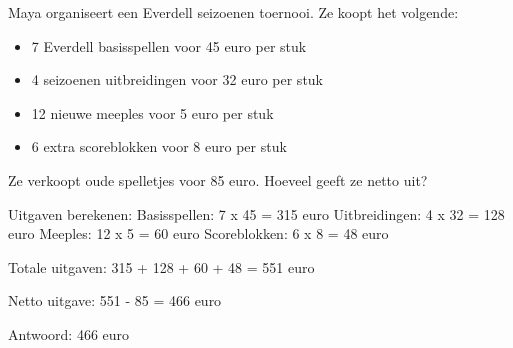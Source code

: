 \begin{opgave}
Maya organiseert een Everdell seizoenen toernooi. Ze koopt het volgende:
\begin{itemize}
\item 7 Everdell basisspellen voor 45 euro per stuk
\item 4 seizoenen uitbreidingen voor 32 euro per stuk  
\item 12 nieuwe meeples voor 5 euro per stuk
\item 6 extra scoreblokken voor 8 euro per stuk
\end{itemize}
Ze verkoopt oude spelletjes voor 85 euro. Hoeveel geeft ze netto uit?
\end{opgave}

\begin{oplossing}
Uitgaven berekenen:
Basisspellen: 7 x 45 = 315 euro
Uitbreidingen: 4 x 32 = 128 euro
Meeples: 12 x 5 = 60 euro
Scoreblokken: 6 x 8 = 48 euro

Totale uitgaven:
315 + 128 + 60 + 48 = 551 euro

Netto uitgave:
551 - 85 = 466 euro

Antwoord: 466 euro
\end{oplossing}